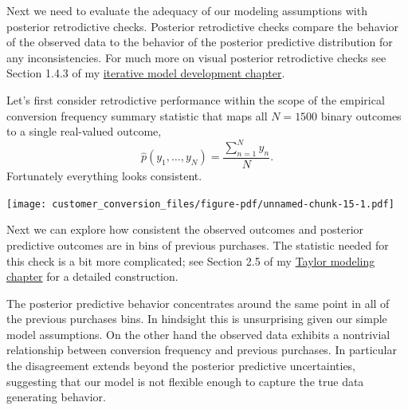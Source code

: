 \documentclass[
  letterpaper,
  DIV=11,
  numbers=noendperiod]{scrartcl}
\newenvironment{Shaded}{\begin{snugshade}}{\end{snugshade}}
\newcommand{\AttributeTok}[1]{\textcolor[rgb]{0.40,0.45,0.13}{#1}}
\newcommand{\DecValTok}[1]{\textcolor[rgb]{0.68,0.00,0.00}{#1}}
\newcommand{\FunctionTok}[1]{\textcolor[rgb]{0.28,0.35,0.67}{#1}}
\newcommand{\NormalTok}[1]{\textcolor[rgb]{0.00,0.23,0.31}{#1}}
\newcommand{\SpecialCharTok}[1]{\textcolor[rgb]{0.37,0.37,0.37}{#1}}
\newcommand{\StringTok}[1]{\textcolor[rgb]{0.13,0.47,0.30}{#1}}
\begin{document}
Next we need to evaluate the adequacy of our modeling assumptions with
posterior retrodictive checks. Posterior retrodictive checks compare the
behavior of the observed data to the behavior of the posterior
predictive distribution for any inconsistencies. For much more on visual
posterior retrodictive checks see Section 1.4.3 of my
\href{https://betanalpha.github.io/assets/case_studies/principled_bayesian_workflow.html\#143_Posterior_Retrodiction_Checks}{iterative
model development chapter}.

Let's first consider retrodictive performance within the scope of the
empirical conversion frequency summary statistic that maps all
\(N = 1500\) binary outcomes to a single real-valued outcome, \[
\hat{p}(y_{1}, \ldots, y_{N}) = \frac{ \sum_{n = 1}^{N} y_{n} }{ N }.
\] Fortunately everything looks consistent.

\begin{Shaded}
\end{Shaded}

\texttt{[image: customer\_conversion\_files/figure-pdf/unnamed-chunk-15-1.pdf]}

Next we can explore how consistent the observed outcomes and posterior
predictive outcomes are in bins of previous purchases. The statistic
needed for this check is a bit more complicated; see Section 2.5 of my
\href{https://betanalpha.github.io/assets/case_studies/taylor_models.html\#25_Posterior_Retrodictive_Checks}{Taylor
modeling chapter} for a detailed construction.

The posterior predictive behavior concentrates around the same point in
all of the previous purchases bins. In hindsight this is unsurprising
given our simple model assumptions. On the other hand the observed data
exhibits a nontrivial relationship between conversion frequency and
previous purchases. In particular the disagreement extends beyond the
posterior predictive uncertainties, suggesting that our model is not
flexible enough to capture the true data generating behavior.
\end{document}
